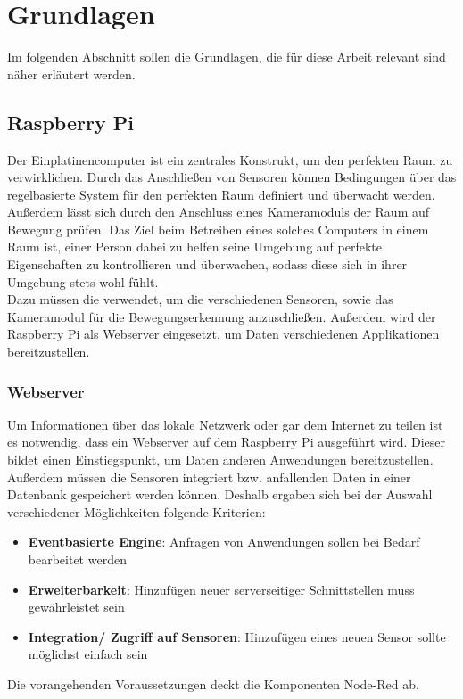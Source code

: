 \chapter{Grundlagen}
Im folgenden Abschnitt sollen die Grundlagen, die für diese Arbeit relevant sind näher erläutert werden.

\section{Raspberry Pi} 
Der Einplatinencomputer ist ein zentrales Konstrukt, um den perfekten Raum zu verwirklichen. Durch das Anschließen von Sensoren können Bedingungen über das regelbasierte System für den perfekten Raum definiert und überwacht werden. Außerdem lässt sich durch den Anschluss eines Kameramoduls der Raum auf Bewegung prüfen. Das Ziel beim Betreiben eines solches Computers in einem Raum ist, einer Person dabei zu helfen seine Umgebung auf perfekte Eigenschaften zu kontrollieren und überwachen, sodass diese sich in ihrer Umgebung stets wohl fühlt. 
\\Dazu müssen die verwendet, um die verschiedenen Sensoren, sowie das Kameramodul für die Bewegungserkennung anzuschließen. Außerdem wird der Raspberry Pi als Webserver eingesetzt, um Daten verschiedenen Applikationen bereitzustellen. 

\subsection{Webserver}
Um Informationen über das lokale Netzwerk oder gar dem Internet zu teilen ist es notwendig, dass ein Webserver auf dem Raspberry Pi ausgeführt wird. Dieser bildet einen Einstiegspunkt, um Daten anderen Anwendungen bereitzustellen. Außerdem müssen die Sensoren integriert bzw. anfallenden Daten in einer Datenbank gespeichert werden können. Deshalb ergaben sich bei der Auswahl verschiedener Möglichkeiten folgende Kriterien:
\begin{itemize}
	\item \textbf{Eventbasierte Engine}: Anfragen von Anwendungen sollen bei Bedarf bearbeitet werden
	\item \textbf{Erweiterbarkeit}: Hinzufügen neuer serverseitiger Schnittstellen muss gewährleistet sein
	\item \textbf{Integration/ Zugriff auf Sensoren}: Hinzufügen eines neuen Sensor sollte möglichst einfach sein
\end{itemize} 
Die vorangehenden Voraussetzungen deckt die Komponenten Node-Red ab.
